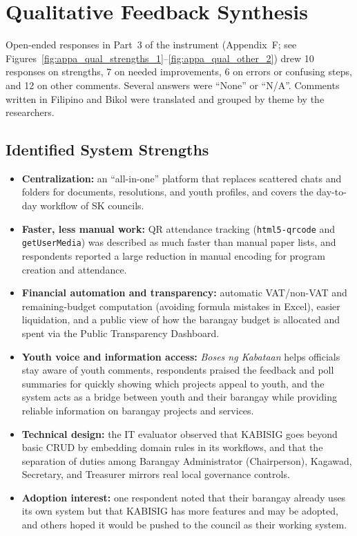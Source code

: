 \section{Qualitative Feedback Synthesis}
\label{sec:qualitative_feedback_synthesis}

\hspace*{\parindent}Open-ended responses in Part~3 of the instrument (Appendix~F; see Figures~\ref{fig:appa_qual_strengths_1}--\ref{fig:appa_qual_other_2}) drew 10 responses on strengths, 7 on needed improvements, 6 on errors or confusing steps, and 12 on other comments. Several answers were ``None'' or ``N/A''. Comments written in Filipino and Bikol were translated and grouped by theme by the researchers.
\vspace{5mm}

\subsection{Identified System Strengths}
\label{subsec:identified_system_strengths}

\begin{itemize}
    \item \textbf{Centralization:} an ``all-in-one'' platform that replaces scattered chats and folders for documents, resolutions, and youth profiles, and covers the day-to-day workflow of SK councils.
    \item \textbf{Faster, less manual work:} QR attendance tracking (\texttt{html5-qrcode} and \texttt{getUserMedia}) was described as much faster than manual paper lists, and respondents reported a large reduction in manual encoding for program creation and attendance.
    \item \textbf{Financial automation and transparency:} automatic VAT/non-VAT and remaining-budget computation (avoiding formula mistakes in Excel), easier liquidation, and a public view of how the barangay budget is allocated and spent via the Public Transparency Dashboard.
    \item \textbf{Youth voice and information access:} \textit{Boses ng Kabataan} helps officials stay aware of youth comments, respondents praised the feedback and poll summaries for quickly showing which projects appeal to youth, and the system acts as a bridge between youth and their barangay while providing reliable information on barangay projects and services.
    \item \textbf{Technical design:} the IT evaluator observed that KABISIG goes beyond basic CRUD by embedding domain rules in its workflows, and that the separation of duties among Barangay Administrator (Chairperson), Kagawad, Secretary, and Treasurer mirrors real local governance controls.
    \item \textbf{Adoption interest:} one respondent noted that their barangay already uses its own system but that KABISIG has more features and may be adopted, and others hoped it would be pushed to the council as their working system.
\end{itemize}
\vspace{5mm}


